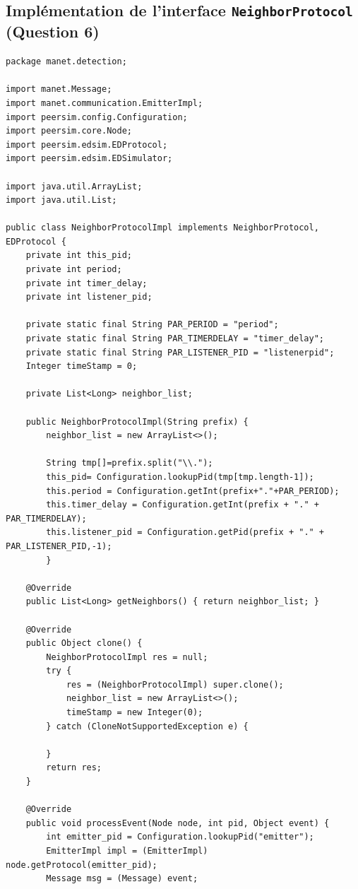 \documentclass[a4paper]{article}
\begin{document}
\subsection{Implémentation de l'interface \texttt{NeighborProtocol} (Question 6)}


\begin{verbatim}
package manet.detection;

import manet.Message;
import manet.communication.EmitterImpl;
import peersim.config.Configuration;
import peersim.core.Node;
import peersim.edsim.EDProtocol;
import peersim.edsim.EDSimulator;

import java.util.ArrayList;
import java.util.List;

public class NeighborProtocolImpl implements NeighborProtocol, EDProtocol {
    private int this_pid;
    private int period;
    private int timer_delay;
    private int listener_pid;

    private static final String PAR_PERIOD = "period";
    private static final String PAR_TIMERDELAY = "timer_delay";
    private static final String PAR_LISTENER_PID = "listenerpid";
    Integer timeStamp = 0;

    private List<Long> neighbor_list;

    public NeighborProtocolImpl(String prefix) {
        neighbor_list = new ArrayList<>();

        String tmp[]=prefix.split("\\.");
        this_pid= Configuration.lookupPid(tmp[tmp.length-1]);
        this.period = Configuration.getInt(prefix+"."+PAR_PERIOD);
        this.timer_delay = Configuration.getInt(prefix + "." + PAR_TIMERDELAY);
        this.listener_pid = Configuration.getPid(prefix + "." + PAR_LISTENER_PID,-1);
        }

    @Override
    public List<Long> getNeighbors() { return neighbor_list; }

    @Override
    public Object clone() {
        NeighborProtocolImpl res = null;
        try {
            res = (NeighborProtocolImpl) super.clone();
            neighbor_list = new ArrayList<>();
            timeStamp = new Integer(0);
        } catch (CloneNotSupportedException e) {

        }
        return res;
    }

    @Override
    public void processEvent(Node node, int pid, Object event) {
        int emitter_pid = Configuration.lookupPid("emitter");
        EmitterImpl impl = (EmitterImpl) node.getProtocol(emitter_pid);
        Message msg = (Message) event;


\end{verbatim}
\end{document}
